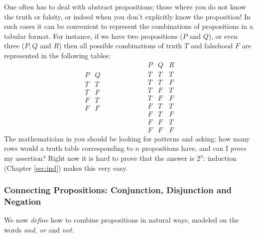 One often has to deal with abstract propositions; those where you do not know the truth or falsity, or indeed when you don't explicitly know the proposition! In such cases it can be convenient to represent the combinations of propositions in a tabular format. For instance, if we have two propositions ($P$ and $Q$), or even three ($P,Q$ and $R$) then all possible combinations of truth $T$ and falsehood $F$ are represented in the following tables:
\[\begin{array}{cc}
P & Q\\\hline
T & T\\
T & F\\
F & T\\
F & F\\
&\\&\\&\\&
\end{array}
\qquad\qquad\qquad
\begin{array}{ccc}
P & Q & R\\\hline
T & T & T\\
T & T & F\\
T & F & T\\
T & F & F\\
F & T & T\\
F & T & F\\
F & F & T\\
F & F & F
\end{array}\]
The mathematician in you should be looking for patterns and asking: how many rows would a truth table corresponding to $n$ propositions have, and can I \emph{prove} my assertion? Right now it is hard to prove that the answer is $2^n$: induction (Chapter \ref{sec:ind}) makes this very easy.

\subsubsection*{Connecting Propositions: Conjunction, Disjunction and Negation}

We now \emph{define} how to combine propositions in natural ways, modeled on the words \emph{and, or} and \emph{not.}

